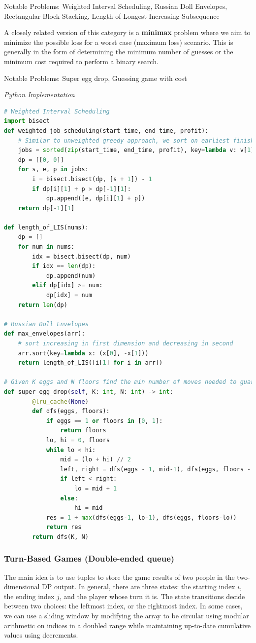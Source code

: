 \documentclass{article}
\begin{document}
Notable Problems: Weighted Interval Scheduling, Russian Doll Envelopes, Rectangular Block Stacking, Length of Longest Increasing Subsequence

A closely related version of this category is a \textbf{minimax} problem where we aim to minimize the possible loss for a worst case (maximum loss) scenario. This is generally in the form of determining the minimum number of guesses or the minimum cost required to perform a binary search.

Notable Problems: Super egg drop, Guessing game with cost %

\vspace{8pt} \emph{Python Implementation}
\begin{lstlisting}[language=Python]
# Weighted Interval Scheduling
import bisect
def weighted_job_scheduling(start_time, end_time, profit):
    # Similar to unweighted greedy approach, we sort on earliest finish time
    jobs = sorted(zip(start_time, end_time, profit), key=lambda v: v[1])
    dp = [[0, 0]]
    for s, e, p in jobs:
        i = bisect.bisect(dp, [s + 1]) - 1
        if dp[i][1] + p > dp[-1][1]:
            dp.append([e, dp[i][1] + p])
    return dp[-1][1]

def length_of_LIS(nums):
    dp = []
    for num in nums:
        idx = bisect.bisect(dp, num)
        if idx == len(dp):
            dp.append(num)
        elif dp[idx] >= num:
            dp[idx] = num
    return len(dp)

# Russian Doll Envelopes
def max_envelopes(arr):
    # sort increasing in first dimension and decreasing in second
    arr.sort(key=lambda x: (x[0], -x[1]))
    return length_of_LIS([i[1] for i in arr])
    
# Given K eggs and N floors find the min number of moves needed to guarantee you find the lowest floor needed to break the egg
def super_egg_drop(self, K: int, N: int) -> int:
        @lru_cache(None)
        def dfs(eggs, floors):
            if eggs == 1 or floors in [0, 1]: 
                return floors
            lo, hi = 0, floors
            while lo < hi:
                mid = (lo + hi) // 2
                left, right = dfs(eggs - 1, mid-1), dfs(eggs, floors - mid)
                if left < right:
                    lo = mid + 1
                else:
                    hi = mid
            res = 1 + max(dfs(eggs-1, lo-1), dfs(eggs, floors-lo))
            return res
        return dfs(K, N)
\end{lstlisting}

\subsubsection*{Turn-Based Games (Double-ended queue)}
The main idea is to use tuples to store the game results of two people in the two-dimensional DP output. In general, there are three states: the starting index $i$, the ending index $j$, and the player whose turn it is. The state transitions decide between two choices: the leftmost index, or the rightmost index. In some cases, we can use a sliding window by modifying the array to be circular using modular arithmetic on indices in a doubled range while maintaining up-to-date cumulative values using decrements.
\end{document}
